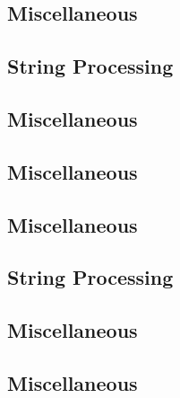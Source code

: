 \subsection{Miscellaneous}
\raggedbottom
\vspace{-.7\baselineskip}\hrulefill
\vspace{0.1\baselineskip}\subsection{String Processing}
\raggedbottom
\vspace{-.7\baselineskip}\hrulefill
\vspace{0.1\baselineskip}\subsection{Miscellaneous}
\raggedbottom
\vspace{-.7\baselineskip}\hrulefill
\vspace{0.1\baselineskip}\subsection{Miscellaneous}
\raggedbottom
\vspace{-.7\baselineskip}\hrulefill
\vspace{0.1\baselineskip}\subsection{Miscellaneous}
\raggedbottom
\vspace{-.7\baselineskip}\hrulefill
\vspace{0.1\baselineskip}\subsection{String Processing}
\raggedbottom
\vspace{-.7\baselineskip}\hrulefill
\vspace{0.1\baselineskip}\subsection{Miscellaneous}
\raggedbottom
\vspace{-.7\baselineskip}\hrulefill
\vspace{0.1\baselineskip}\subsection{Miscellaneous}
\raggedbottom
\vspace{-.7\baselineskip}\hrulefill
\vspace{0.1\baselineskip}
